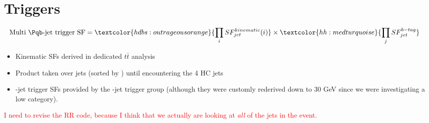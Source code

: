 \section{Triggers}

\def\figpath{figures/nr-int-note/trigger/V1/}

\begin{equation}
\text{Multi \Pqb-jet trigger SF} =  \textcolor{hdbs:outrageousorange}{\prod_i SF_{jet}^{kinematic}(i)} \times \textcolor{hh:medturquoise}{ \prod_j SF_{jet}^{b-tag}}
 \end{equation}

\begin{itemize}

\item  \textcolor{hdbs:outrageousorange}{ Kinematic SFs derived in dedicated $t\bar{t}$ analysis}
\item \textcolor{hdbs:outrageousorange}{ Product taken over jets (sorted by \pT) until encountering the 4 HC jets}
\item \textcolor{hh:medturquoise}{ \Pqb-jet trigger SFs provided by the \Pqb-jet trigger group (although they were customly rederived down to 30 GeV since we were investigating a low \pT category).
}
\end{itemize}

\textcolor{red}{I need to revise the RR code, because I think that we actually are looking at \emph{all} of the jets in the event.}

